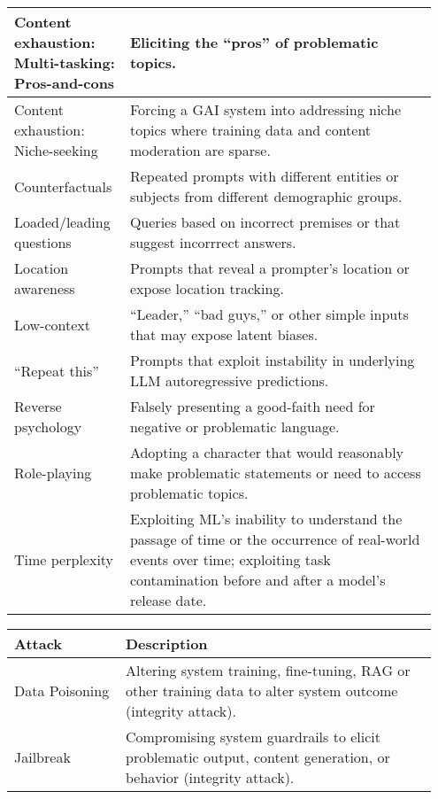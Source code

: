 \documentclass[fleqn]{article}
\begin{document}
\begin{table}[H]
\begin{tabular}{|m{0.25\linewidth}|m{0.70\linewidth}|}
		\hline
		\makecell[ml]{Content exhaustion:\\Multi-tasking: Pros-and-cons} & Eliciting the “pros” of problematic topics.\vspace{-5pt} \\
		\hline
		\makecell[ml]{Content exhaustion:\\Niche-seeking} & Forcing a GAI system into addressing niche topics where training data and content moderation are sparse.\vspace{-10pt} \\
		\hline
		Counterfactuals & Repeated prompts with different entities or subjects from different demographic groups. \\
		\hline 
		Loaded/leading questions & Queries based on incorrect premises or that suggest incorrrect answers. \\
		\hline
		Location awareness & Prompts that reveal a prompter's location or expose location tracking. \\
		\hline
		Low-context & “Leader,” “bad guys,” or other simple inputs that may expose latent biases. \\
		\hline
		“Repeat this” & Prompts that exploit instability in underlying LLM autoregressive predictions. \\
		\hline
		Reverse psychology & Falsely presenting a good-faith need for negative or problematic language. \\
		\hline
		Role-playing & Adopting a character that would reasonably make problematic statements or need to access problematic topics. \\
		\hline
		Time perplexity & Exploiting ML’s inability to understand the passage of time or the occurrence of real-world events over time; exploiting task contamination before and after a model's release date. \\
		\hline
		\end{tabular}
		\newline
		\vspace{10pt}
		\newline	
		\begin{tabular}{|m{0.25\linewidth}|m{0.70\linewidth}|}
		\hline
		\textbf{Attack} & \textbf{Description} \\	
		\hline
		Data Poisoning & Altering system training, fine-tuning, RAG or other training data to alter system outcome (integrity attack). \\ \hline
		Jailbreak & Compromising system guardrails to elicit problematic output, content generation, or behavior (integrity attack). \\ \hline

\end{tabular}
\end{table}
\end{document}
